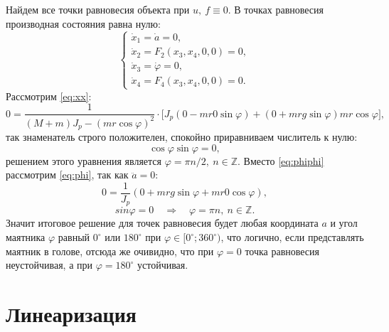 Найдем все точки равновесия объекта при $u,\ f\equiv0$. В точках равновесия производная состояния
равна нулю:
\begin{equation*}
    \begin{cases}
        \dot x_1 = \dot a = 0,\\
        \dot x_2 = F_2(x_3, x_4, 0, 0)= 0,\\
        \dot x_3 = \dot\varphi=0,\\
        \dot x_4 = F_4(x_3, x_4, 0, 0)=0.
    \end{cases}
\end{equation*}
Рассмотрим \eqref{eq:xx}:
\begin{equation*}
    0=\frac{1}{(M+m)J_p-(mr\cos\varphi)^2}\cdot
    \Big[J_p(0-mr0\sin\varphi)+(0+mrg\sin\varphi)mr\cos\varphi\Big],
\end{equation*}
так знаменатель строго положителен, спокойно приравниваем числитель к нулю:
\begin{equation*}
    \cos\varphi\sin\varphi=0,
\end{equation*}
решением этого уравнения является $\varphi=\pi n/2,\ n\in\mathbb{Z}$.
Вместо \eqref{eq:phiphi} рассмотрим \eqref{eq:phi}, так как $\ddot a=0$:
\begin{equation*}
    0=\frac{1}{J_p}(0+mrg\sin\varphi+mr0\cos\varphi),
\end{equation*}
\begin{equation*}
    sin\varphi=0\quad\Rightarrow\quad\varphi=\pi n,\ n\in\mathbb{Z}.
\end{equation*}
Значит итоговое решение для точек равновесия будет любая координата $a$ и угол маятника $\varphi$
равный $0^\circ $ или $180^\circ $ при $\varphi\in[0^\circ;360^\circ)$, что логично, если представлять
маятник в голове, отсюда же очивидно, что при $\varphi=0$ точка равновесия неустойчивая, а при 
$\varphi=180^\circ$ устойчивая.


\section{Линеаризация}

